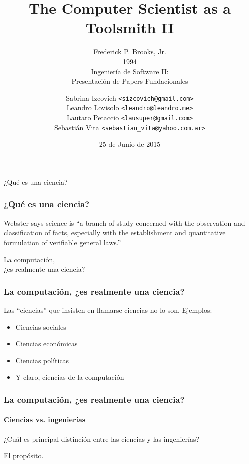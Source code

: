 \documentclass[spanish]{beamer}
\title{The Computer Scientist as a Toolsmith II}
\subtitle{
  Frederick P. Brooks, Jr. \\
  1994 \\
  \vspace{2em}
  Ingeniería de Software II: \\
  Presentación de Papers Fundacionales
}
\author{
  Sabrina Izcovich \texttt{<sizcovich@gmail.com>} \\
  Leandro Lovisolo \texttt{<leandro@leandro.me>} \\
  Lautaro Petaccio \texttt{<lausuper@gmail.com>} \\
  Sebastián Vita \texttt{<sebastian\_vita@yahoo.com.ar>}
}
\date{25 de Junio de 2015}
\institute{
  Departamento de Computación \\
  Facultad de Ciencias Exactas y Naturales \\
  Universidad de Buenos Aires
}
\begin{document}
\begin{frame}
  \titlepage
\end{frame}

\begin{frame}
  \begin{center}
    \Huge{
      ¿Qué es una ciencia?
    }
  \end{center}
\end{frame}

\begin{frame}
  \frametitle{¿Qué es una ciencia?}

  Webster says science is ``a branch of study concerned
  with the observation and classification of facts, especially
  with the establishment and quantitative formulation
  of verifiable general laws.''
\end{frame}

\begin{frame}
  \begin{center}
    \Huge{
      La computación,\\
      ¿es realmente una ciencia?
    }
  \end{center}
\end{frame}

\begin{frame}
  \frametitle{La computación, ¿es realmente una ciencia?}

  Las ``ciencias'' que insisten en llamarse ciencias no lo son.
  \pause
  Ejemplos:
  \pause

  \begin{itemize}
    \item Ciencias sociales \pause
    \item Ciencias económicas \pause
    \item Ciencias políticas \pause
    \item Y claro, ciencias de la computación
  \end{itemize}
\end{frame}

\begin{frame}
  \frametitle{La computación, ¿es realmente una ciencia?}
  \framesubtitle{Ciencias vs. ingenierías}

  \pause

  ¿Cuál es principal distinción entre las ciencias y las ingenierías?

  \pause

  \vspace{2em}
  El propósito.
\end{frame}
\end{document}

